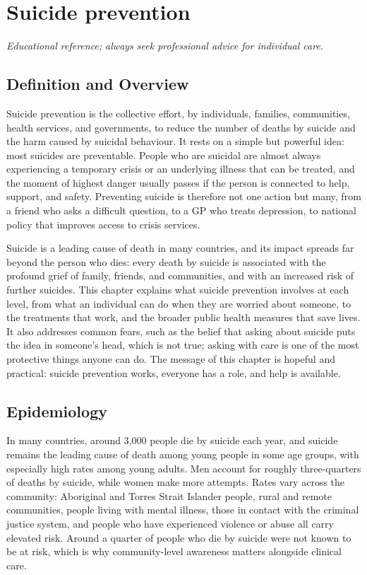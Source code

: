 \chapter{Suicide prevention}

\medskip
\noindent\textit{Educational reference; always seek professional advice for individual care.}

\section*{Definition and Overview}
Suicide prevention is the collective effort, by individuals, families, communities, health services, and governments, to reduce the number of deaths by suicide and the harm caused by suicidal behaviour. It rests on a simple but powerful idea: most suicides are preventable. People who are suicidal are almost always experiencing a temporary crisis or an underlying illness that can be treated, and the moment of highest danger usually passes if the person is connected to help, support, and safety. Preventing suicide is therefore not one action but many, from a friend who asks a difficult question, to a GP who treats depression, to national policy that improves access to crisis services.

Suicide is a leading cause of death in many countries, and its impact spreads far beyond the person who dies: every death by suicide is associated with the profound grief of family, friends, and communities, and with an increased risk of further suicides. This chapter explains what suicide prevention involves at each level, from what an individual can do when they are worried about someone, to the treatments that work, and the broader public health measures that save lives. It also addresses common fears, such as the belief that asking about suicide puts the idea in someone's head, which is not true; asking with care is one of the most protective things anyone can do. The message of this chapter is hopeful and practical: suicide prevention works, everyone has a role, and help is available.

\section*{Epidemiology}
In many countries, around 3,000 people die by suicide each year, and suicide remains the leading cause of death among young people in some age groups, with especially high rates among young adults. Men account for roughly three-quarters of deaths by suicide, while women make more attempts. Rates vary across the community: Aboriginal and Torres Strait Islander people, rural and remote communities, people living with mental illness, those in contact with the criminal justice system, and people who have experienced violence or abuse all carry elevated risk. Around a quarter of people who die by suicide were not known to be at risk, which is why community-level awareness matters alongside clinical care.

